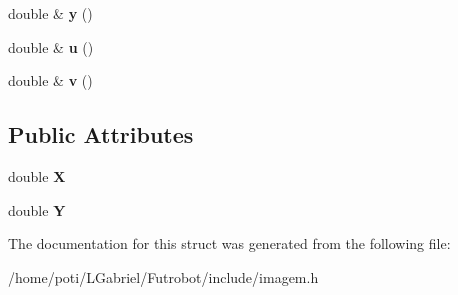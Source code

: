 \begin{DoxyCompactItemize}
\item 
double \& {\bfseries y} ()\hypertarget{structCoord2_a5dbc345a7c5a6371886bb284e71e2fe4}{}\label{structCoord2_a5dbc345a7c5a6371886bb284e71e2fe4}

\item 
double \& {\bfseries u} ()\hypertarget{structCoord2_a02d1c8a107e75fc851bd19faa3beedef}{}\label{structCoord2_a02d1c8a107e75fc851bd19faa3beedef}

\item 
double \& {\bfseries v} ()\hypertarget{structCoord2_aad2551178d28ce6688ac2a7f79c39206}{}\label{structCoord2_aad2551178d28ce6688ac2a7f79c39206}

\end{DoxyCompactItemize}
\subsection*{Public Attributes}
\begin{DoxyCompactItemize}
\item 
double {\bfseries X}\hypertarget{structCoord2_a26ae37341f3cb105fd6834a7fec26c1d}{}\label{structCoord2_a26ae37341f3cb105fd6834a7fec26c1d}

\item 
double {\bfseries Y}\hypertarget{structCoord2_a0b5c903f3b93f7d26fb38ae57c0f3bd1}{}\label{structCoord2_a0b5c903f3b93f7d26fb38ae57c0f3bd1}

\end{DoxyCompactItemize}


The documentation for this struct was generated from the following file\+:\begin{DoxyCompactItemize}
\item 
/home/poti/\+L\+Gabriel/\+Futrobot/include/imagem.\+h\end{DoxyCompactItemize}
